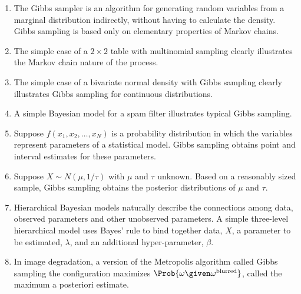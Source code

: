 \documentclass[12pt]{article}
\begin{document}
\begin{enumerate}
    \item
        The Gibbs sampler is an algorithm for generating random
        variables from a marginal distribution indirectly, without
        having to calculate the density.  Gibbs sampling is based only
        on elementary properties of Markov chains.
    \item
        The simple case of a \( 2 \times 2 \) table with multinomial
        sampling clearly illustrates the Markov chain nature of the
        process.
    \item
        The simple case of a bivariate normal density with Gibbs
        sampling clearly illustrates Gibbs sampling for continuous
        distributions.
    \item
        A simple Bayesian model for a spam filter illustrates typical
        Gibbs sampling.
    \item
        Suppose \( f(x_1, x_2, \dots, x_N) \) is a probability
        distribution in which the variables represent parameters of a
        statistical model.  Gibbs sampling obtains point and interval
        estimates for these parameters.
    \item
        Suppose \( X \sim N(\mu, 1/\tau) \) with \( \mu \) and \( \tau \)
        unknown.  Based on a reasonably sized sample, Gibbs sampling
        obtains the posterior distributions of \( \mu \) and \( \tau \).
    \item
        Hierarchical Bayesian models naturally describe the connections
        among data, observed parameters and other unobserved parameters.
        A simple three-level hierarchical model uses Bayes' rule to bind
        together data, \( X \), a parameter to be estimated, \( \lambda \),
        and an additional hyper-parameter, \( \beta \).
    \item
        In image degradation, a version of the Metropolis algorithm
        called Gibbs sampling the configuration maximizes \( \Prob{\omega
        \given \omega^{\text{blurred}}} \), called the maximum a
        posteriori estimate.
\end{enumerate}

\hr

\end{document}

